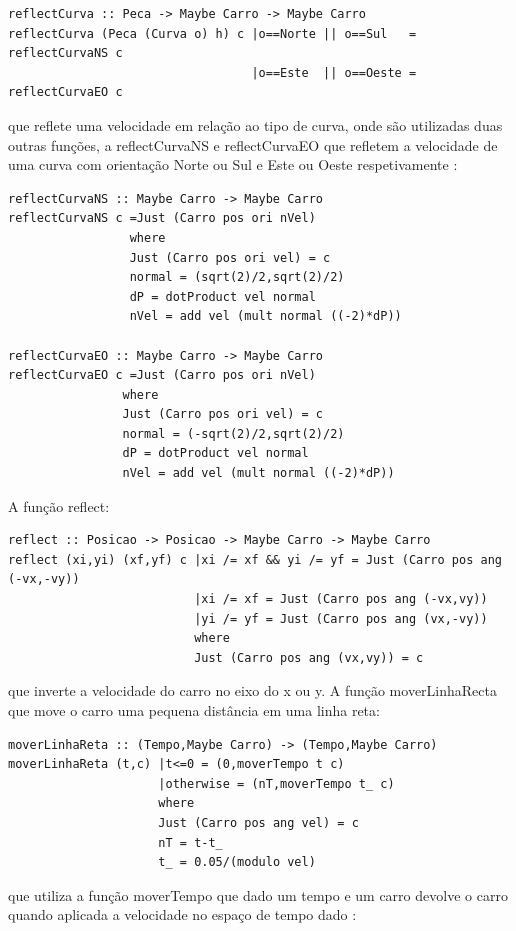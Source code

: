 \documentclass[a4paper]{report} %
\begin{document}
\begin{verbatim}
reflectCurva :: Peca -> Maybe Carro -> Maybe Carro
reflectCurva (Peca (Curva o) h) c |o==Norte || o==Sul   = reflectCurvaNS c
                                  |o==Este  || o==Oeste = reflectCurvaEO c
\end{verbatim}
que reflete uma velocidade em relação ao tipo de curva, onde são utilizadas duas outras funções, a reflectCurvaNS e reflectCurvaEO que refletem a velocidade de uma curva com orientação Norte ou Sul e Este ou Oeste respetivamente :

\begin{verbatim}
reflectCurvaNS :: Maybe Carro -> Maybe Carro
reflectCurvaNS c =Just (Carro pos ori nVel)
                 where
                 Just (Carro pos ori vel) = c
                 normal = (sqrt(2)/2,sqrt(2)/2)
                 dP = dotProduct vel normal
                 nVel = add vel (mult normal ((-2)*dP))

reflectCurvaEO :: Maybe Carro -> Maybe Carro
reflectCurvaEO c =Just (Carro pos ori nVel)
                where
                Just (Carro pos ori vel) = c
                normal = (-sqrt(2)/2,sqrt(2)/2)
                dP = dotProduct vel normal
                nVel = add vel (mult normal ((-2)*dP))

\end{verbatim}
A função reflect:

\begin{verbatim}
reflect :: Posicao -> Posicao -> Maybe Carro -> Maybe Carro
reflect (xi,yi) (xf,yf) c |xi /= xf && yi /= yf = Just (Carro pos ang (-vx,-vy))
                          |xi /= xf = Just (Carro pos ang (-vx,vy))
                          |yi /= yf = Just (Carro pos ang (vx,-vy))
                          where
                          Just (Carro pos ang (vx,vy)) = c
\end{verbatim}
que inverte a velocidade do carro no eixo do x ou y. A função moverLinhaRecta que move o carro uma pequena distância em uma linha reta:

\begin{verbatim}
moverLinhaReta :: (Tempo,Maybe Carro) -> (Tempo,Maybe Carro)
moverLinhaReta (t,c) |t<=0 = (0,moverTempo t c)
                     |otherwise = (nT,moverTempo t_ c)
                     where
                     Just (Carro pos ang vel) = c
                     nT = t-t_
                     t_ = 0.05/(modulo vel)
\end{verbatim}
que utiliza a função moverTempo que dado um tempo e um carro devolve o carro quando aplicada a velocidade no espaço de tempo dado :
\end{document}
